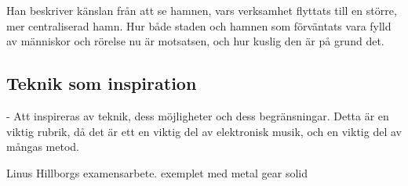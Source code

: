 \documentclass{article}
\begin{document}
Han beskriver känslan från att se hamnen, vars verksamhet flyttats till en större, mer centraliserad hamn. 
Hur både staden och hamnen som förväntats vara fylld av människor och rörelse nu är motsatsen, och hur kuslig
den är på grund det.

















\subsection{Teknik som inspiration}
- Att inspireras av teknik, dess möjligheter och dess begränsningar. Detta är en viktig rubrik, då det är ett
  en viktig del av elektronisk musik, och en viktig del av mångas metod. 

  Linus Hillborgs examensarbete. exemplet med metal gear solid
\end{document}
